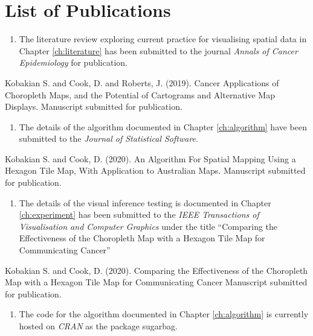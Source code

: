 \documentclass{monashthesis}
\begin{document}
\hypertarget{list-of-publications}{%
\chapter*{List of Publications}\label{list-of-publications}}

\begin{enumerate}
\def\labelenumi{\arabic{enumi}.}
\tightlist
\item
  The literature review exploring current practice for visualising spatial data in Chapter \ref{ch:literature} has been submitted to the journal \emph{Annals of Cancer Epidemiology} for publication.
\end{enumerate}

Kobakian S. and Cook, D. and Roberts, J. (2019). Cancer Applications of Choropleth Maps, and the Potential of Cartograms and Alternative Map Displays. Manuscript submitted for publication.

\begin{enumerate}
\def\labelenumi{\arabic{enumi}.}
\setcounter{enumi}{1}
\tightlist
\item
  The details of the algorithm documented in Chapter \ref{ch:algorithm} have been submitted to the \emph{Journal of Statistical Software}.
\end{enumerate}

Kobakian S. and Cook, D. (2020). An Algorithm For Spatial Mapping Using a Hexagon Tile Map, With Application to Australian Maps. Manuscript submitted for publication.

\begin{enumerate}
\def\labelenumi{\arabic{enumi}.}
\setcounter{enumi}{2}
\tightlist
\item
  The details of the visual inference testing is documented in Chapter \ref{ch:experiment} has been submitted to the \emph{IEEE Transactions of Visualisation and Computer Graphics} under the title ``Comparing the Effectiveness of the Choropleth Map with a Hexagon Tile Map for Communicating Cancer''
\end{enumerate}

Kobakian S. and Cook, D. (2020). Comparing the Effectiveness of the Choropleth Map
with a Hexagon Tile Map for Communicating Cancer Manuscript submitted for publication.

\begin{enumerate}
\def\labelenumi{\arabic{enumi}.}
\setcounter{enumi}{3}
\tightlist
\item
  The code for the algorithm documented in Chapter \ref{ch:algorithm} is currently hosted on \emph{CRAN} as the package sugarbag.
\end{enumerate}
\end{document}
